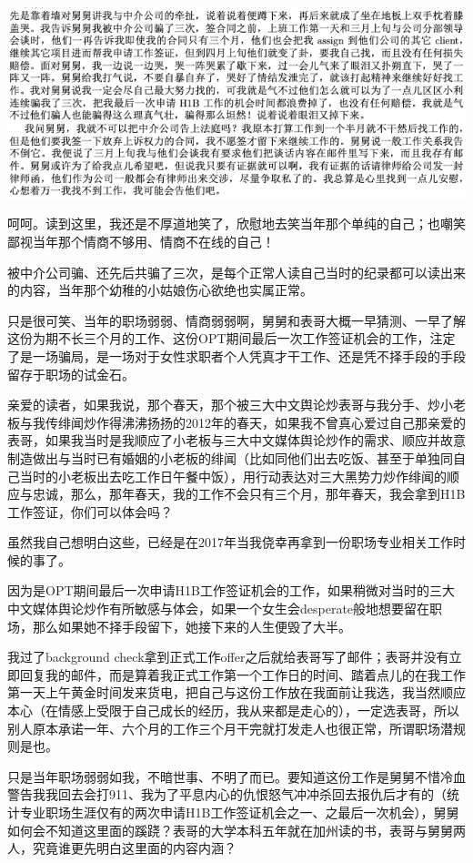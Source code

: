 \documentclass[9pt, b5paper]{article}
\begin{document}
\begin{center}
\includegraphics[width=.9\linewidth]{./pic/p1p119-4.png}
\end{center}

呵呵。读到这里，我还是不厚道地笑了，欣慰地去笑当年那个单纯的自己；也嘲笑鄙视当年那个情商不够用、情商不在线的自己！

被中介公司骗、还先后共骗了三次，是每个正常人读自己当时的纪录都可以读出来的内容，当年那个幼稚的小姑娘伤心欲绝也实属正常。

只是很可笑、当年的职场弱弱、情商弱弱啊，舅舅和表哥大概一早猜测、一早了解这份为期不长三个月的工作、这份OPT期间最后一次工作签证机会的工作，注定了是一场骗局，是一场对于女性求职者个人凭真才干工作、还是凭不择手段的手段留存于职场的试金石。

亲爱的读者，如果我说，那个春天，那个被三大中文舆论炒表哥与我分手、炒小老板与我传绯闻炒作得沸沸扬扬的2012年的春天，如果我不曾真心爱过自己那亲爱的表哥，如果我当时是我顺应了小老板与三大中文媒体舆论炒作的需求、顺应并故意制造做出与当时已有婚姻的小老板的绯闻（比如同他们出去吃饭、甚至于单独同自己当时的小老板出去吃工作日午餐中饭），用行动表达对三大黑势力炒作绯闻的顺应与忠诚，那么，那年春天，我的工作不会只有三个月，那年春天，我会拿到H1B工作签证，你们可以体会吗？

虽然我自己想明白这些，已经是在2017年当我侥幸再拿到一份职场专业相关工作时候的事了。

因为是OPT期间最后一次申请H1B工作签证机会的工作，如果稍微对当时的三大中文媒体舆论炒作有所敏感与体会，如果一个女生会desperate般地想要留在职场，那么如果她不择手段留下，她接下来的人生便毁了大半。 

我过了background check拿到正式工作offer之后就给表哥写了邮件；表哥并没有立即回复我的邮件，而是算着我正式工作第一个工作日的时间、踏着点儿的在我工作第一天上午黄金时间发来货电，把自己与这份工作放在我面前让我选，我当然顺应本心（在情感上受限于自己成长的经历，我从来都是走心的），一定选表哥，所以别人原本承诺一年、六个月的工作三个月干完就打发走人也很正常，所谓职场潜规则是也。 

只是当年职场弱弱如我，不暗世事、不明了而已。要知道这份工作是舅舅不惜冷血警告我我回去会打911、我为了平息内心的仇恨怒气冲冲杀回去报仇后才有的（统计专业职场生涯仅有的两次申请H1B工作签证机会之一、之最后一次机会），舅舅如何会不知道这里面的蹊跷？表哥的大学本科五年就在加州读的书，表哥与舅舅两人，究竟谁更先明白这里面的内容内涵？
\end{document}
